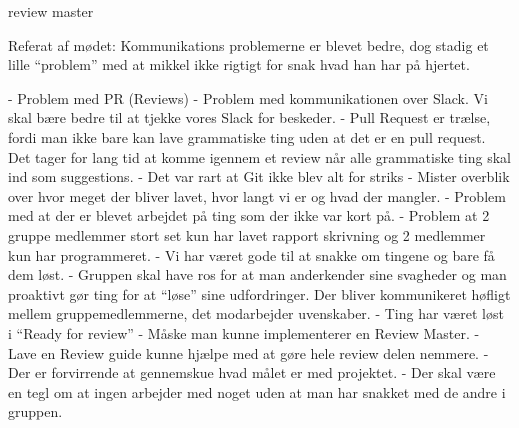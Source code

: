 review master

Referat af mødet:
Kommunikations problemerne er blevet bedre, dog stadig et lille “problem” med at mikkel ikke rigtigt for snak hvad han har på hjertet.

- Problem med PR (Reviews) 
- Problem med kommunikationen over Slack. Vi skal bære bedre til at tjekke vores Slack for beskeder.
- Pull Request er trælse, fordi man ikke bare kan lave grammatiske ting uden at det er en pull request. Det tager for lang tid at komme igennem et review når alle grammatiske ting skal ind som suggestions.
- Det var rart at Git ikke blev alt for striks
- Mister overblik over hvor meget der bliver lavet, hvor langt vi er og hvad der mangler.
- Problem med at der er blevet arbejdet på ting som der ikke var kort på.
- Problem at 2 gruppe medlemmer stort set kun har lavet rapport skrivning og 2 medlemmer kun har programmeret.
- Vi har været gode til at snakke om tingene og bare få dem løst.
- Gruppen skal have ros for at man anderkender sine svagheder og man proaktivt gør ting for at “løse” sine udfordringer. Der bliver kommunikeret høfligt mellem gruppemedlemmerne, det modarbejder uvenskaber.
- Ting har været løst i “Ready for review”
- Måske man kunne implementerer en Review Master.
- Lave en Review guide kunne hjælpe med at gøre hele review delen nemmere.
- Der er forvirrende at gennemskue hvad målet er med projektet.
- Der skal være en tegl om at ingen arbejder med noget uden at man har snakket med de andre i gruppen.
